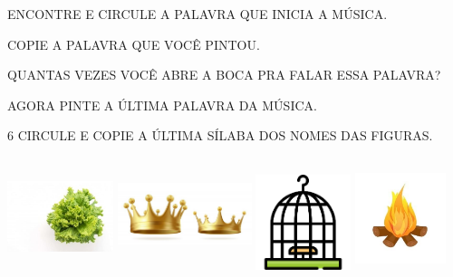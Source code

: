 \begin{escolha}
\item ENCONTRE E CIRCULE A PALAVRA QUE INICIA A MÚSICA.

\item COPIE A PALAVRA QUE VOCÊ PINTOU.



\item QUANTAS VEZES VOCÊ ABRE A BOCA PRA FALAR ESSA PALAVRA?


\item AGORA PINTE A ÚLTIMA PALAVRA DA MÚSICA.
\end{escolha}

\num{6} CIRCULE E COPIE A ÚLTIMA SÍLABA DOS NOMES DAS FIGURAS.

\includegraphics[width=1.22307in,height=1.24422in]{media/image86.jpg}
\includegraphics[width=1.53669in,height=1.29710in]{media/image87.jpg}
\includegraphics[width=1.09375in,height=1.09375in]{media/image88.png}
\includegraphics[width=1.03854in,height=1.20356in]{media/image89.jpg}

